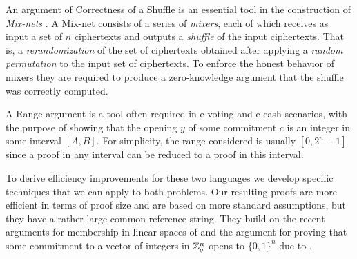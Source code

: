 An argument of Correctness of a Shuffle is an essential tool in the construction of \emph{Mix-nets} \cite{Chaum81}. A Mix-net consists of a series of \emph{mixers}, each of which receives as input a set of $n$ ciphertexts and  outputs a \emph{shuffle} of the input ciphertexts. That is, a \emph{rerandomization} of the set of ciphertexts obtained after applying a \emph{random permutation} to the input set of ciphertexts. To enforce the honest behavior of mixers they are required to produce a zero-knowledge argument that the shuffle was correctly computed.  

A Range argument is a tool often required in e-voting and e-cash scenarios, with the purpose of showing that the opening $y$ of some commitment $c$ is an integer in some interval $[A,B]$. For simplicity, the range considered is usually $[0,2^n-1]$ since a proof in any interval can be reduced to a proof in this interval.

To derive efficiency improvements for these two languages we develop specific techniques that we can apply to both problems. Our resulting proofs are more efficient in terms of proof size and are based on more standard assumptions, but they have a rather large common reference string. They build on the recent arguments for membership in linear spaces of \cite{EC:LPJY14,C:JutRoy14,EC:KilWee15} and the argument for proving that some commitment to a vector of integers in $\mathbb{Z}_q^{n}$ opens to $\{0,1\}^n$ due to \cite{AC:GonHevRaf15}. 
         
